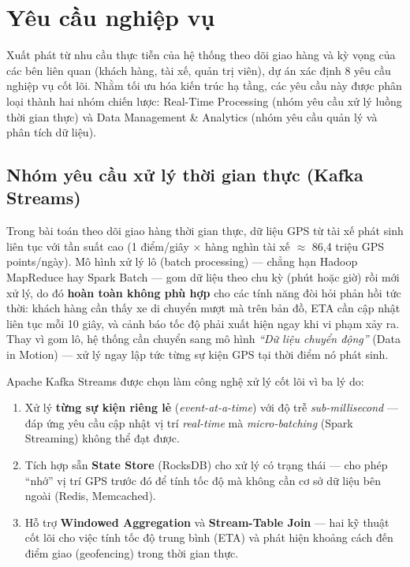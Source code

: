 \section{Yêu cầu nghiệp vụ}
\label{sec:business-requirements}

Xuất phát từ nhu cầu thực tiễn của hệ thống theo dõi giao hàng và kỳ vọng của các bên liên quan (khách hàng, tài xế, quản trị viên), dự án xác định 8 yêu cầu nghiệp vụ cốt lõi. Nhằm tối ưu hóa kiến trúc hạ tầng, các yêu cầu này được phân loại thành hai nhóm chiến lược: Real-Time Processing (nhóm yêu cầu xử lý luồng thời gian thực) và Data Management \& Analytics (nhóm yêu cầu quản lý và phân tích dữ liệu).

\subsection{Nhóm yêu cầu xử lý thời gian thực (Kafka Streams)}
\label{sec:realtime-requirements}

Trong bài toán theo dõi giao hàng thời gian thực, dữ liệu GPS từ tài xế phát sinh liên tục với tần suất cao (1 điểm/giây $\times$ hàng nghìn tài xế $\approx$ 86,4 triệu GPS points/ngày). Mô hình xử lý lô (batch processing) — chẳng hạn Hadoop MapReduce hay Spark Batch — gom dữ liệu theo chu kỳ (phút hoặc giờ) rồi mới xử lý, do đó \textbf{hoàn toàn không phù hợp} cho các tính năng đòi hỏi phản hồi tức thời: khách hàng cần thấy xe di chuyển mượt mà trên bản đồ, ETA cần cập nhật liên tục mỗi 10 giây, và cảnh báo tốc độ phải xuất hiện ngay khi vi phạm xảy ra. Thay vì gom lô, hệ thống cần chuyển sang mô hình \textit{``Dữ liệu chuyển động''} (Data in Motion) — xử lý ngay lập tức từng sự kiện GPS tại thời điểm nó phát sinh.

Apache Kafka Streams được chọn làm công nghệ xử lý cốt lõi vì ba lý do:
\begin{enumerate}
    \item Xử lý \textbf{từng sự kiện riêng lẻ} (\textit{event-at-a-time}) với độ trễ \textit{sub-millisecond} — đáp ứng yêu cầu cập nhật vị trí \textit{real-time} mà \textit{micro-batching} (Spark Streaming) không thể đạt được.
    \item Tích hợp sẵn \textbf{State Store} (RocksDB) cho xử lý có trạng thái — cho phép ``nhớ'' vị trí GPS trước đó để tính tốc độ mà không cần cơ sở dữ liệu bên ngoài (Redis, Memcached).
    \item Hỗ trợ \textbf{Windowed Aggregation} và \textbf{Stream-Table Join} — hai kỹ thuật cốt lõi cho việc tính tốc độ trung bình (ETA) và phát hiện khoảng cách đến điểm giao (geofencing) trong thời gian thực.
\end{enumerate}

